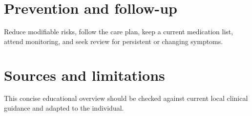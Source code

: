\section*{Prevention and follow-up}
Reduce modifiable risks, follow the care plan, keep a current medication list, attend monitoring, and seek review for persistent or changing symptoms.

\section*{Sources and limitations}
This concise educational overview should be checked against current local clinical guidance and adapted to the individual.
